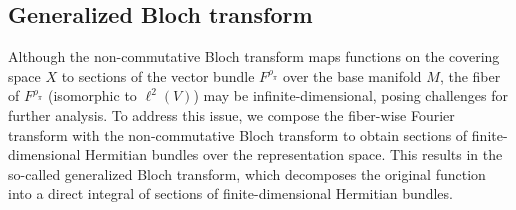 \documentclass[11pt,oneside,reqno]{amsart}
\theoremstyle{definition}
\numberwithin{equation}{section}
\theoremstyle{plain}
\begin{document}




\subsection{Generalized Bloch transform}\label{gbtrans}

Although the non-commutative Bloch transform maps functions on the covering space $X$ to sections of the vector bundle $F^{\rho_{\pi}}$ over the base manifold $M$, the fiber of $F^{\rho_{\pi}}$ (isomorphic to $\ell^2(V)$) may be infinite-dimensional, posing challenges for further analysis. 
To address this issue, we compose the fiber-wise Fourier transform with the non-commutative Bloch transform to obtain sections of finite-dimensional Hermitian bundles over the representation space. This results in the so-called generalized Bloch transform, which decomposes the original function into a direct integral of sections of finite-dimensional Hermitian bundles.
\end{document}
